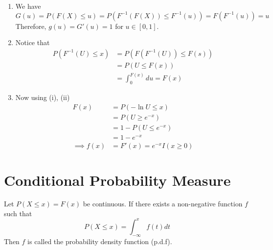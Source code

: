 \begin{enumerate}[label=(\roman*)]
    \item We have
    \[G(u) = P(F(X) \leq u) = P(F^{-1}(F(X)) \leq F^{-1}(u)) = F(F^{-1}(u)) = u\]
    Therefore, $g(u) = G'(u) = 1$ for $u \in [0,1]$.
    \item Notice that 
    \begin{align*}
        P(F^{-1}(U) \leq x) &= P(F(F^{-1}(U)) \leq F(s))\\
        &= P(U \leq F(x))\\
        &= \int_0^{F(x)} du = F(x)
    \end{align*}
    \item Now using (i), (ii)
    \begin{align*}
        F(x) &= P(-\ln U \leq x)\\
        &= P(U \geq e^{-x})\\
        &= 1 - P(U \leq e^{-x})\\
        &= 1 - e^{-x}\\
        \implies f(x) &= F'(x) = e^{-x}I(x \geq 0)
    \end{align*}    
\end{enumerate}



\section{Conditional Probability Measure}
\begin{definition}
    Let $P(X \leq x) = F(x)$ be continuous. If there exists a non-negative function $f$ such that 
    \[P(X \leq x) = \int_{-\infty}^x f(t)dt\]
    Then $f$ is called the probability density function (p.d.f). 
\end{definition}


